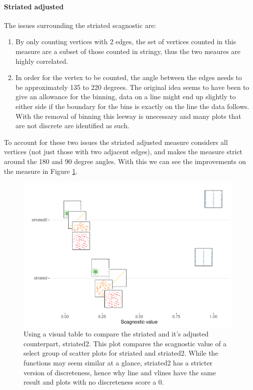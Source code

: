 \hypertarget{striated-adjusted}{%
\paragraph{Striated adjusted}\label{striated-adjusted}}

The issues surrounding the striated scagnostic are:

\begin{enumerate}
\def\labelenumi{\arabic{enumi}.}
\item
  By only counting vertices with 2 edges, the set of vertices counted in
  this measure are a subset of those counted in stringy, thus the two
  meaures are highly correlated.
\item
  In order for the vertex to be counted, the angle between the edges
  needs to be approximately 135 to 220 degrees. The original idea seems
  to have been to give an allowance for the binning, data on a line
  might end up slightly to either side if the boundary for the bins is
  exactly on the line the data follows. With the removal of binning this
  leeway is unecessary and many plots that are not discrete are
  identified as such.
\end{enumerate}

To account for these two issues the striated adjusted measure considers
all vertices (not just those with two adjacent edges), and makes the
measure strict around the 180 and 90 degree angles. With this we can see
the improvements on the measure in Figure \ref{fig:striated-vtable}.

\begin{Schunk}
\begin{figure}
\includegraphics[width=1\linewidth]{mason-lee-laa-cook_files/figure-latex/striated-vtable-1} \caption[Using a visual table to compare the striated and it's adjusted counterpart, striated2]{Using a visual table to compare the striated and it's adjusted counterpart, striated2. This plot compares the scagnostic value of a select group of scatter plots for striated and striated2. While the functions may seem similar at a glance, striated2 has a stricter version of discreteness, hence why line and vlines have the same result and plots with no discreteness score a 0.}\label{fig:striated-vtable}
\end{figure}
\end{Schunk}

